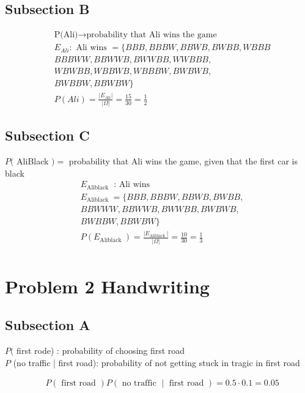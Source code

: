 \documentclass[a4paper,11pt]{article}
\theoremstyle{mytheor}
\begin{document}
\subsection{Subsection B}


\begin{align*}
&\text{P(Ali)}\rightarrow\text{probability that Ali wins the game}\\
& E_{A l i}: \text { Ali wins }=\{B B B, B B B W, B B W B, B W B B, W B B B \\
& B B B W W, B B W W B, B W W B B, W W B B B, \\
& W B W B B, W B B W B, W B B B W, B W B W B, \\
&B W B B W, B B W B W\} \\
& P(A l i)=\frac{\left|E_{A l i}\right|}{|\Omega|}=\frac{15}{30}=\frac{1}{2}
\end{align*}

\subsection{Subsection C}

$P($ AliBlack $)=$ probability that Ali wins the game, given that the first car is black
\begin{align*}
& E_{\text {Aliblack }} \text { : Ali wins } \\
& E_{\text {Aliblack }}=\{B B B, B B B W, B B W B, B W B B , \\
& BBWWW, BBWWB, BWWBB, BWBWB, \\
& B W B B W, B B W B W\} \\
& P\left(E_{\text {Aliblack }}\right)=\frac{\left|E_{\text {Aliblack }}\right|}{|\Omega|}=\frac{10}{30}=\frac{1}{3} \\
&
\end{align*}
\newpage
\section{Problem 2 Handwriting}

\subsection{Subsection A}
$P($ first rode) : probability of choosing first road\\
$P$ (no traffic | first road): probability of not getting stuck in tragic in first road

\begin{align*}
& P(\text { first road }) P(\text { no traffic } \mid \text { first road })= 0.5 \cdot 0.1=0.05
\end{align*}
\end{document}

